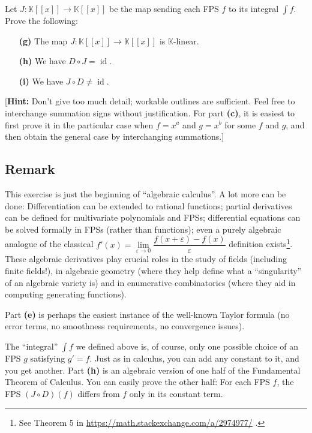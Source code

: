\documentclass[paper=a4, fontsize=12pt]{scrartcl} %
\newcommand{\KK}{\mathbb{K}} %
\newcommand{\id}{\operatorname{id}} %
\newcommand{\tup}[1]{\left( #1 \right)}
\newcommand{\ivee}[1]{\left[ \left[ #1 \right] \right]}
\theoremstyle{plainsl}
\theoremstyle{definition}
\theoremstyle{remark}
\begin{document}
Let $J : \KK\ivee{x} \to \KK\ivee{x}$ be the map sending
each FPS $f$ to its integral $\int f$.
Prove the following:

\begin{enumerate}

\item[\textbf{(g)}]
The map $J : \KK\ivee{x} \to \KK\ivee{x}$ is $\KK$-linear.

\item[\textbf{(h)}]
We have $D \circ J = \id$.

\item[\textbf{(i)}]
We have $J \circ D \neq \id$.

\end{enumerate}

[\textbf{Hint:} Don't give too much detail; workable outlines
are sufficient.
Feel free to interchange summation signs without justification.
For part \textbf{(c)}, it is easiest to first prove it
in the particular case when $f = x^a$ and $g = x^b$ for some
$f$ and $g$, and then obtain the general case by interchanging
summations.]

\subsection{Remark}

This exercise is just the beginning of ``algebraic calculus''.
A lot more can be done: Differentiation can be extended to
rational functions; partial derivatives can be defined for
multivariate polynomials and FPSs; differential equations can
be solved formally in FPSs (rather than functions); even a
purely algebraic analogue of the classical
$f'\tup{x} = \lim\limits_{\varepsilon\to 0} \dfrac{f\tup{x+\varepsilon} - f\tup{x}}{\varepsilon}$
definition exists\footnote{See Theorem 5 in
\url{https://math.stackexchange.com/a/2974977/} .}.
These algebraic derivatives play crucial roles in the
study of fields (including finite fields!), in algebraic
geometry (where they help define what a
``singularity'' of an algebraic variety is) and in
enumerative combinatorics (where they aid in computing
generating functions).

Part \textbf{(e)} is perhaps the easiest instance of
the well-known Taylor formula (no error terms, no
smoothness requirements, no convergence issues).

The ``integral'' $\int f$ we defined above is, of course,
only one possible choice of an FPS $g$ satisfying $g' = f$.
Just as in calculus, you can add any constant to it, and
you get another.
Part \textbf{(h)} is an algebraic version of one half of
the Fundamental Theorem of Calculus.
You can easily prove the other half: For each FPS $f$,
the FPS $\tup{J \circ D} \tup{f}$ differs from $f$ only
in its constant term.
\end{document}

